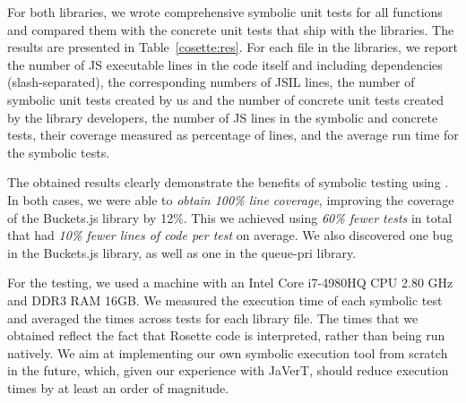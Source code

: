 For both libraries, we wrote comprehensive symbolic unit tests for all functions and compared them with the concrete unit tests that ship with the libraries. The results are presented in Table~\ref{cosette:res}.
For each file in the libraries, we report the number of JS executable lines in the code itself and including dependencies (slash-separated), the corresponding numbers of JSIL lines, the number of symbolic unit tests created by us and the number of concrete unit tests created by the library developers, the number of JS lines in the symbolic and concrete tests, their coverage measured as percentage of lines, and the average \cosette run time for the symbolic tests.

The obtained results clearly demonstrate the benefits of symbolic testing using \cosette. In both cases, we were able to \emph{obtain 100\% line coverage}, improving the coverage of the Buckets.js library by 12\%. This we achieved using \emph{60\% fewer tests} in total that had \emph{10\% fewer lines of code per test} on average.
We also discovered one bug in the Buckets.js library, as well as one in the queue-pri library. 


For the testing, we used a machine with an Intel Core i7-4980HQ CPU 2.80 GHz and DDR3 RAM 16GB. We measured the execution time of each symbolic test and averaged the times across tests for each library file. The times that we obtained reflect the fact that Rosette code is interpreted, rather than being run natively. We aim at implementing our own symbolic execution tool from scratch in the future, which, given our experience with JaVerT, should reduce execution times by at least an order of magnitude.

